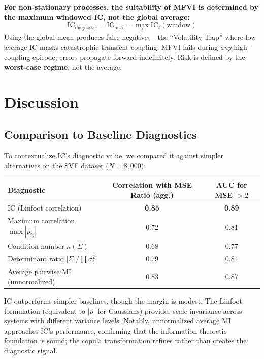 \documentclass[10pt]{article} %
\theoremstyle{plain}
\theoremstyle{definition}
\newcommand{\IC}{\mathrm{IC}}  %
\begin{document}
\begin{tcolorbox}[breakable, colback=red!5, colframe=red!50!black, title=\textbf{The Maximal Coupling Rule}, fonttitle=\bfseries]
\textbf{For non-stationary processes, the suitability of MFVI is determined by the maximum windowed IC, not the global average:}
\begin{equation}
\IC_{\text{diagnostic}} = \IC_{\max} = \max_t \IC_t(\text{window})
\end{equation}
Using the global mean produces false negatives---the ``Volatility Trap'' where low average IC masks catastrophic transient coupling. MFVI fails during \emph{any} high-coupling episode; errors propagate forward indefinitely. Risk is defined by the \textbf{worst-case regime}, not the average.
\end{tcolorbox}

\section{Discussion}
\label{sec:discussion}

\subsection{Comparison to Baseline Diagnostics}

To contextualize IC's diagnostic value, we compared it against simpler alternatives on the SVF dataset ($N = 8{,}000$):

\begin{center}
\begin{tabular}{lcc}
\toprule
Diagnostic & Correlation with MSE Ratio (agg.) & AUC for MSE $> 2$ \\
\midrule
IC (Linfoot correlation) & \textbf{0.85} & \textbf{0.89} \\
Maximum correlation $\max|\rho_{ij}|$ & 0.72 & 0.81 \\
Condition number $\kappa(\Sigma)$ & 0.68 & 0.77 \\
Determinant ratio $|\Sigma|/\prod \sigma_i^2$ & 0.79 & 0.84 \\
Average pairwise MI (unnormalized) & 0.83 & 0.87 \\
\bottomrule
\end{tabular}
\end{center}

\noindent IC outperforms simpler baselines, though the margin is modest. The Linfoot formulation (equivalent to $|\rho|$ for Gaussians) provides scale-invariance across systems with different variance levels. Notably, unnormalized average MI approaches IC's performance, confirming that the information-theoretic foundation is sound; the copula transformation refines rather than creates the diagnostic signal.
\end{document}
